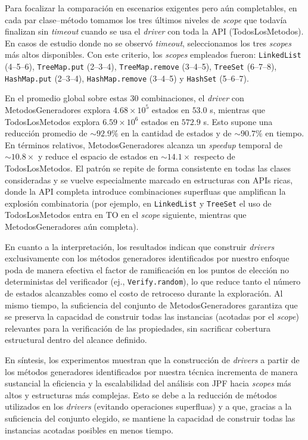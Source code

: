 Para focalizar la comparación en escenarios exigentes pero aún completables,
en cada par clase–método tomamos los tres últimos niveles de \emph{scope}
que todavía finalizan sin \emph{timeout} cuando se usa el \emph{driver} con toda
la API (\textsf{TodosLosMetodos}). En casos de estudio donde no se observó \emph{timeout},
seleccionamos los tres \emph{scopes} más altos disponibles. Con este criterio,
los \emph{scopes} empleados fueron: \texttt{LinkedList} (4–5–6),
\texttt{TreeMap.put} (2–3–4), \texttt{TreeMap.remove} (3–4–5),
\texttt{TreeSet} (6–7–8), \texttt{HashMap.put} (2–3–4),
\texttt{HashMap.remove} (3–4–5) y \texttt{HashSet} (5–6–7).

En el promedio global sobre estas 30 combinaciones, el \emph{driver} con
\textsf{MetodosGeneradores} explora \(4.68\times 10^5\) estados en \(53.0\) s, mientras que
\textsf{TodosLosMetodos} explora \(6.59\times 10^6\) estados en \(572.9\) s. Esto supone
una reducción promedio de \(\sim 92.9\%\) en la cantidad de estados y de
\(\sim 90.7\%\) en tiempo. En términos relativos, \textsf{MetodosGeneradores} alcanza un
\emph{speedup} temporal de \(\sim 10.8\times\) y reduce el espacio de estados en
\(\sim 14.1\times\) respecto de \textsf{TodosLosMetodos}. El patrón se repite de forma
consistente en todas las clases consideradas y se vuelve especialmente marcado en
estructuras con APIs ricas, donde la API completa introduce combinaciones
superfluas que amplifican la explosión combinatoria (por ejemplo, en
\texttt{LinkedList} y \texttt{TreeSet} el uso de \textsf{TodosLosMetodos} entra en TO en
el \emph{scope} siguiente, mientras que \textsf{MetodosGeneradores} aún completa).

En cuanto a la interpretación, los resultados indican que construir \emph{drivers}
exclusivamente con los métodos generadores identificados por nuestro enfoque
poda de manera efectiva el factor de ramificación en los puntos de elección
no deterministas del verificador (ej., \texttt{Verify.random}), lo que reduce
tanto el número de estados alcanzables como el costo de retroceso durante la
exploración. Al mismo tiempo, la suficiencia del conjunto de \textsf{MetodosGeneradores}
garantiza que se preserva la capacidad de construir todas las instancias
(acotadas por el \emph{scope}) relevantes para la verificación de las propiedades,
sin sacrificar cobertura estructural dentro del alcance definido.

En síntesis, los experimentos muestran que la construcción de \emph{drivers} a
partir de los métodos generadores identificados por nuestra técnica incrementa de
manera sustancial la eficiencia y la escalabilidad del análisis con JPF hacia
\emph{scopes} más altos y estructuras más complejas. Esto se debe a la reducción
de métodos utilizados en los \emph{drivers} (evitando operaciones superfluas) y a
que, gracias a la suficiencia del conjunto elegido, se mantiene la capacidad
de construir todas las instancias acotadas posibles en menos tiempo.

